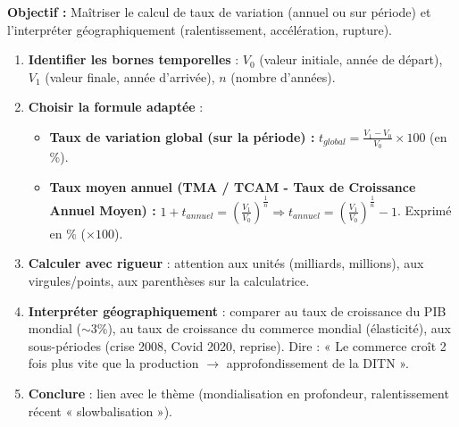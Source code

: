 \documentclass[11pt]{article}
\begin{document}
\begin{methode}
    \textbf{Objectif :} Maîtriser le calcul de taux de variation (annuel ou sur période) et l'interpréter géographiquement (ralentissement, accélération, rupture).
    \begin{enumerate}
        \item \textbf{Identifier les bornes temporelles} : $V_0$ (valeur initiale, année de départ), $V_1$ (valeur finale, année d'arrivée), $n$ (nombre d'années).
        \item \textbf{Choisir la formule adaptée} :
            \begin{itemize}
                \item \textbf{Taux de variation global (sur la période) :} $t_{global} = \frac{V_1 - V_0}{V_0} \times 100$ (en \%).
                \item \textbf{Taux moyen annuel (TMA / TCAM - Taux de Croissance Annuel Moyen) :} $1 + t_{annuel} = \left(\frac{V_1}{V_0}\right)^{\frac{1}{n}} \Rightarrow t_{annuel} = \left(\frac{V_1}{V_0}\right)^{\frac{1}{n}} - 1$. Exprimé en \% ($ \times 100$).
            \end{itemize}
        \item \textbf{Calculer avec rigueur} : attention aux unités (milliards, millions), aux virgules/points, aux parenthèses sur la calculatrice.
        \item \textbf{Interpréter géographiquement} : comparer au taux de croissance du PIB mondial ($\sim 3\%$), au taux de croissance du commerce mondial (élasticité), aux sous-périodes (crise 2008, Covid 2020, reprise). Dire : « Le commerce croît 2 fois plus vite que la production $\rightarrow$ approfondissement de la DITN ».
        \item \textbf{Conclure} : lien avec le thème (mondialisation en profondeur, ralentissement récent « slowbalisation »).
    \end{enumerate}
\end{methode}
\end{document}
